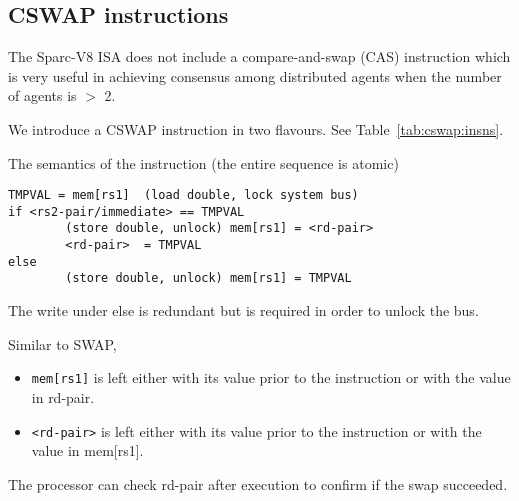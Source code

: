 \subsection{CSWAP instructions}
\label{sec:cswap-instructions}

The Sparc-V8 ISA does not include a compare-and-swap (CAS) instruction
which is very  useful in achieving consensus  among distributed agents
when the number of agents is $>$ 2.

We   introduce   a   CSWAP   instruction   in   two   flavours.    See
Table~\ref{tab:cswap:insns}.

The semantics of the instruction (the entire sequence is atomic)
\begin{verbatim}
TMPVAL = mem[rs1]  (load double, lock system bus)
if <rs2-pair/immediate> == TMPVAL 
        (store double, unlock) mem[rs1] = <rd-pair>  
        <rd-pair>  = TMPVAL
else
        (store double, unlock) mem[rs1] = TMPVAL
\end{verbatim}
The write under  else is redundant but is required  in order to unlock
the bus.

Similar to SWAP, 
\begin{itemize}[noitemsep]
\item  \verb|mem[rs1]| is  left either  with  its value  prior to  the
  instruction or with the value in rd-pair.
\item  \verb|<rd-pair>| is  left either  with its  value prior  to the
  instruction or with the value in mem[rs1].
\end{itemize}
The processor can check rd-pair after execution to confirm if the swap
succeeded.


